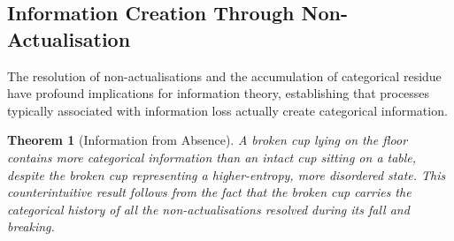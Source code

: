 \documentclass[12pt,a4paper]{article}
\newtheorem{theorem}{Theorem}[section]
\theoremstyle{definition}
\theoremstyle{remark}
\begin{document}
\subsection{Information Creation Through Non-Actualisation}

The resolution of non-actualisations and the accumulation of categorical residue have profound implications for information theory, establishing that processes typically associated with information loss actually create categorical information.

\begin{theorem}[Information from Absence]
\label{thm:information_absence}
A broken cup lying on the floor contains more categorical information than an intact cup sitting on a table, despite the broken cup representing a higher-entropy, more disordered state. This counterintuitive result follows from the fact that the broken cup carries the categorical history of all the non-actualisations resolved during its fall and breaking.
\end{theorem}
\end{document}
